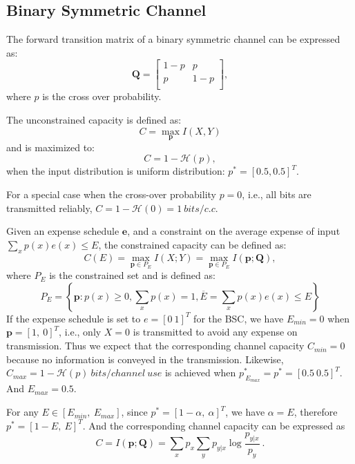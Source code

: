\documentclass[a4paper,10pt]{article}
\begin{document}
\subsection{Binary Symmetric Channel}
The forward transition matrix of a binary symmetric channel can be expressed as:
\[\mathbf{Q} = \left[
\begin{array}{ccc}
1-p & p \\
p & 1-p \\
\end{array}
\right],\]
where $p$ is the cross over probability.

The unconstrained capacity is defined as:
\begin{equation}
 C = \max_{\mathbf{p}}{I(X,Y)}
\end{equation}
and is maximized to:
\begin{equation}
 C = 1 - \mathcal{H}(p), 
\end{equation}
when the input distribution is uniform distribution: $p^* = [0.5,0.5]^T$. 

For a special case when the cross-over probability $p=0$, i.e., all bits are transmitted reliably, $C = 1-\mathcal{H}(0) = 1\ bits/c.c$.

Given an expense schedule $\mathbf{e}$, and a constraint on the average expense of input $\sum_{x}{p(x)e(x)}\leq E$, the constrained capacity can be defined as:
\begin{equation}
 C(E) = \max_{\mathbf{p}\in P_E} {I(X;Y)} = \max_{\mathbf{p}\in P_E} {I(\mathbf{p};\mathbf{Q})},
\end{equation}
where $P_E$ is the constrained set and is defined as:
\begin{equation}
 P_E = \left\lbrace \mathbf{p}: p(x)\geq 0, \sum_{x}{p(x)}=1, \overline{E}=\sum_{x}{p(x)e(x)} \leq E \right\rbrace 
\end{equation}
If the expense schedule is set to $e=[0\ 1]^T$ for the BSC, we have $E_{min}=0$ when $\mathbf{p}=[1,\ 0]^T$, i.e., only $X=0$ is transmitted to avoid any expense on transmission. Thus we expect that the corresponding channel capacity $C_{min}=0$ because no information is conveyed in the transmission. Likewise, $C_{max}=1-\mathcal{H}(p)\ bits/channel\ use$ is achieved when $p^*_{\ E_{max}}=p^*=[0.5\ 0.5]^T$. And $E_{max}=0.5$.

For any $E\in[E_{min},\ E_{max}]$, since $p^*=[1-\alpha,\ \alpha]^T$, we have $\alpha=E$, therefore $p^*=[1-E,\ E]^T$. And the corresponding channel capacity can be expressed as
\begin{equation}
 C=I(\mathbf{p};\mathbf{Q})=\sum_{x}{p_x {\sum_{y} {p_{y|x}\log{\frac{p_{y|x}}{p_y}}}}}\ .
\end{equation}
\end{document}
